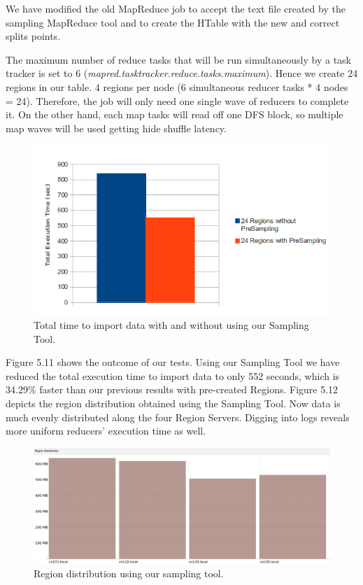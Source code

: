 We have modified the old MapReduce job to accept the text file created by the sampling MapReduce tool and to create the HTable with the new and correct splits points.
\par
The maximum number of reduce tasks that will be run simultaneously by a task tracker is set to 6 (\textit{mapred.tasktracker.reduce.tasks.maximum}). Hence we create 24 regions in our table. 4 regions per node (6 simultaneous reducer tasks {*} 4 nodes = 24). Therefore, the job will only need one single wave of reducers to complete it. On the other hand, each map tasks will read off one DFS block, so multiple map waves will be used getting hide shuffle latency.


\begin{figure}[htb]
\centering
\includegraphics[width=1\textwidth]{./images/24regionsChartSampling.png}
\caption{Total time to import data with and without using our Sampling Tool.} \label{fig:regionDistribution3}
\end{figure}

Figure 5.11 shows the outcome of our tests. Using our Sampling Tool we have reduced the total execution time to import data to only 552 seconds, which is 34.29\% faster than our previous results with pre-created Regions. Figure 5.12 depicts the region distribution obtained using the Sampling Tool. Now data is much evenly distributed along the four Region Servers. Digging into logs reveals more uniform reducers' execution time as well.


\begin{figure}[htb]
\centering
\includegraphics[width=1\textwidth,height=0.31\textheight]{./images/usingSampling1.png}
\caption{Region distribution using our sampling tool.} \label{fig:regionDistribution2}
\end{figure}


